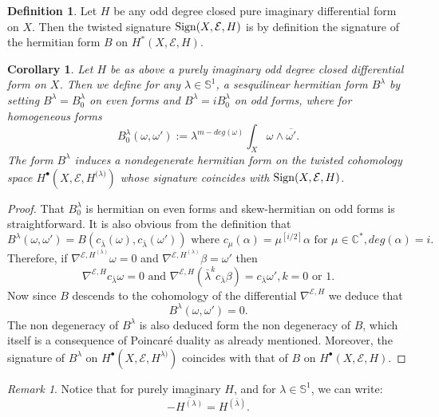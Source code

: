 \documentclass[12pt]{amsart}
\theoremstyle{plain}
\newtheorem{corollary}[theorem]{Corollary}
\theoremstyle{definition}
\newtheorem{definition}[theorem]{Definition}
\theoremstyle{remark}
\newtheorem{remark}[theorem]{Remark}
\begin{document}
{{
\begin{definition}\label{def:signature}
Let $H$ be any odd degree closed pure imaginary differential form on $X$. Then the  twisted signature ${\rm Sign}(X, {\mathcal E}, H)$ is by definition the signature of 
the hermitian  form $B$ on $H^*(X,{\mathcal E},H)$.
\end{definition}
 }}

{{
\begin{corollary}
Let $H$ be as above a purely imaginary odd degree closed differential form on $X$. Then we define for any $\lambda \in {\mathbb{S}}^1$, a sesquilinear hermitian form 
$B^\lambda$  by setting $B^\lambda = B_0^\lambda$ on even forms and $B^\lambda= i B_0^\lambda$ 
on odd forms, where for homogeneous forms
$$
B_0^\lambda (\omega, \omega'):= \lambda^{ m - deg (\omega)} \int_X \omega \wedge {\overline{\omega'}}.
$$
The form $B^\lambda$ induces a nondegenerate hermitian form  
on the twisted cohomology space $H^\bullet (X, {\mathcal E}, H^{{{(}}\lambda)})$ whose signature coincides with ${\rm Sign}(X, {\mathcal E}, H)$.
\end{corollary}
}}

\begin{proof}
That $B_0^\lambda$ is hermitian on even forms and skew-hermitian on odd forms is straightforward. It is also obvious from the definition that 
$$
B^\lambda (\omega, \omega') = B(c_{\bar\lambda} (\omega), c_{\bar\lambda} (\omega')) \text{ where } c_\mu (\alpha)=\mu^{[i/2]} \alpha \text{ for } \mu\in {\mathbb{C}}^*, deg (\alpha)=i.
$$
Therefore, if $\nabla^{{\mathcal E}, H^{(\lambda)}} \omega = 0$ and $\nabla^{{\mathcal E}, H^{(\lambda)}}\beta =\omega'$ then
$$
 \nabla^{{\mathcal E}, H} c_{\bar\lambda} \omega = 0 \text{ and } \nabla^{{\mathcal E}, H}({\bar\lambda}^k c_{\bar\lambda}\beta) = c_{\bar\lambda} \omega', k=0 \text{ or } 1.
$$
Now since $B$ descends to the cohomology of the differential $\nabla^{{\mathcal E}, H}$ we deduce that 
$$
B^\lambda (\omega, \omega') = 0.
$$
The non degeneracy of $B^\lambda$ is also deduced form the non degeneracy of $B$, which itself is a consequence of Poincar\'e duality as already mentioned. Moreover, the signature 
of $B^\lambda$ on $H^\bullet (X, {\mathcal E}, H^{\lambda)})$ coincides with that {{of}} $B$ on $H^\bullet (X, {\mathcal E}, H)$.
\end{proof}

\begin{remark}
 Notice that for purely imaginary $H$, and for $\lambda\in {\mathbb{S}}^1$, we can write:
$$
- {\overline{H^{(\lambda)}}} = H^{(\bar\lambda)}.
$$
\end{remark}
\end{document}
